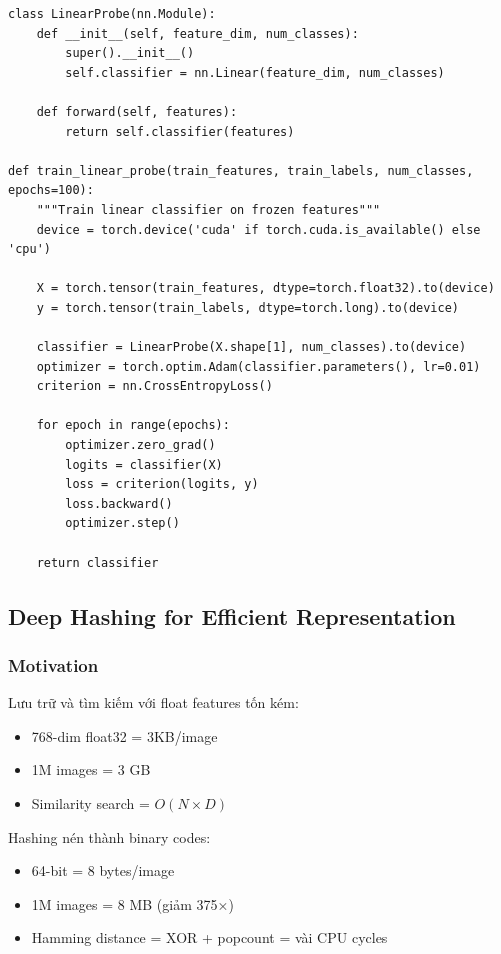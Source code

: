 \documentclass[12pt,a4paper]{article}
\begin{document}
\begin{lstlisting}[caption={Linear Probe Implementation}]
class LinearProbe(nn.Module):
    def __init__(self, feature_dim, num_classes):
        super().__init__()
        self.classifier = nn.Linear(feature_dim, num_classes)
    
    def forward(self, features):
        return self.classifier(features)

def train_linear_probe(train_features, train_labels, num_classes, epochs=100):
    """Train linear classifier on frozen features"""
    device = torch.device('cuda' if torch.cuda.is_available() else 'cpu')
    
    X = torch.tensor(train_features, dtype=torch.float32).to(device)
    y = torch.tensor(train_labels, dtype=torch.long).to(device)
    
    classifier = LinearProbe(X.shape[1], num_classes).to(device)
    optimizer = torch.optim.Adam(classifier.parameters(), lr=0.01)
    criterion = nn.CrossEntropyLoss()
    
    for epoch in range(epochs):
        optimizer.zero_grad()
        logits = classifier(X)
        loss = criterion(logits, y)
        loss.backward()
        optimizer.step()
    
    return classifier
\end{lstlisting}

\subsection{Deep Hashing for Efficient Representation}

\subsubsection{Motivation}

Lưu trữ và tìm kiếm với float features tốn kém:
\begin{itemize}
    \item 768-dim float32 = 3KB/image
    \item 1M images = 3 GB
    \item Similarity search = $O(N \times D)$
\end{itemize}

Hashing nén thành binary codes:
\begin{itemize}
    \item 64-bit = 8 bytes/image
    \item 1M images = 8 MB (giảm 375×)
    \item Hamming distance = XOR + popcount = vài CPU cycles
\end{itemize}
\end{document}
